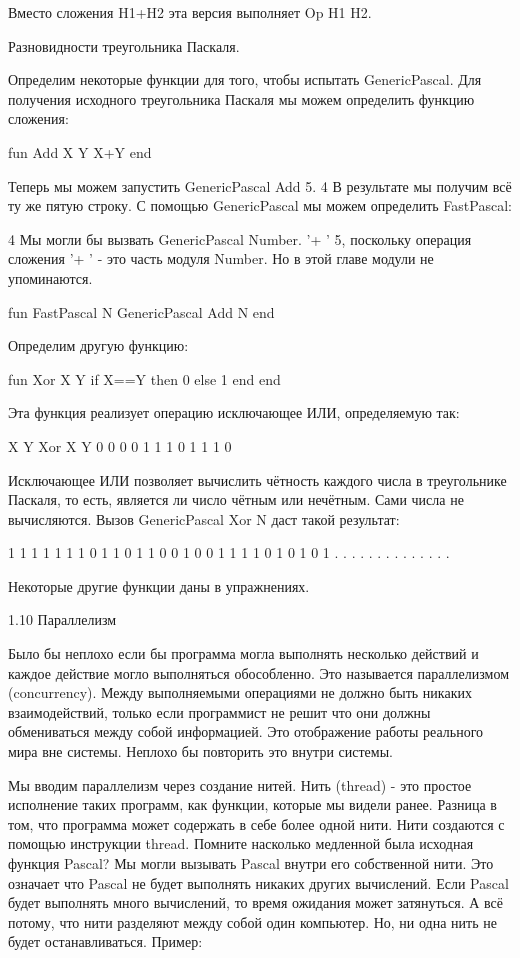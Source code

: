 Вместо сложения H1+H2 эта версия выполняет {Op H1 H2}.

Разновидности треугольника Паскаля.

Определим некоторые функции для того, чтобы испытать GenericPascal. Для получения исходного треугольника Паскаля мы можем определить функцию сложения:

fun {Add X Y} X+Y end

Теперь мы можем запустить {GenericPascal Add 5}. 4 В результате мы получим всё ту же пятую строку. С помощью GenericPascal мы можем определить FastPascal:

4 Мы могли бы вызвать {GenericPascal Number. '+ ' 5}, поскольку операция сложения  '+ ' - это часть модуля Number. Но в этой главе модули не упоминаются.

fun {FastPascal N} {GenericPascal Add N} end

Определим другую функцию:

fun {Xor X Y} if X==Y then 0 else 1 end end

Эта функция реализует операцию исключающее ИЛИ, определяемую так:

X Y {Xor X Y}
0 0 0
0 1 1
1 0 1
1 1 0

Исключающее ИЛИ позволяет вычислить чётность каждого числа в треугольнике Паскаля, то есть, является ли число чётным или нечётным. Сами числа не вычисляются. Вызов {GenericPascal Xor N} даст такой результат:

1
1
1
1
1
1
1
0
1
1
0
1
1
0
0
1
0
0
1
1
1
1
0
1
0
1
0
1
. . . . . . . . . . . . . .

Некоторые другие функции даны в упражнениях.

1.10 Параллелизм

Было бы неплохо если бы программа могла выполнять несколько действий и каждое действие могло выполняться обособленно. Это называется параллелизмом (concurrency). Между выполняемыми операциями не должно быть никаких взаимодействий, только если программист не решит что они должны обмениваться между собой информацией. Это отображение работы реального мира вне системы. Неплохо бы повторить это внутри системы.

Мы вводим параллелизм через создание нитей. Нить (thread) - это простое исполнение таких программ, как функции, которые мы видели ранее. Разница в том, что программа может содержать в себе более одной нити. Нити создаются с помощью инструкции thread. Помните насколько медленной была исходная функция Pascal? Мы могли вызывать Pascal внутри его собственной нити. Это означает что Pascal не будет выполнять никаких других вычислений. Если Pascal будет выполнять много вычислений, то время ожидания может затянуться. А всё потому, что нити разделяют между собой один компьютер. Но, ни одна нить не будет останавливаться. Пример:

